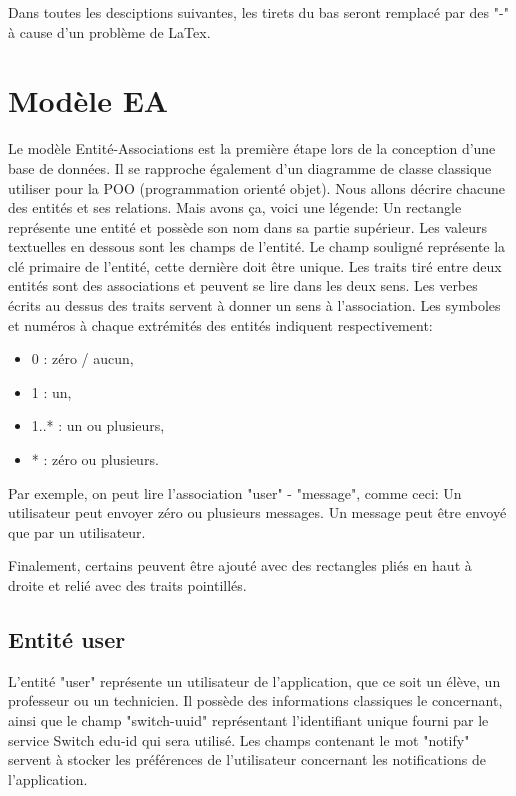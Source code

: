 \documentclass[
    iai, %
    il, %
]{heig-tb}
\begin{document}

Dans toutes les desciptions suivantes, les tirets du bas seront remplacé par des "-" à cause d'un problème de LaTex.

\section{Modèle EA}
Le modèle Entité-Associations est la première étape lors de la conception d'une base de données. Il se rapproche également d'un diagramme de classe classique utiliser pour la POO (programmation orienté objet).\newline
Nous allons décrire chacune des entités et ses relations.\newline
Mais avons ça, voici une légende:\newline
Un rectangle représente une entité et possède son nom dans sa partie supérieur.\newline
Les valeurs textuelles en dessous sont les champs de l'entité. Le champ souligné représente la clé primaire de l'entité, cette dernière doit être unique.\newline
Les traits tiré entre deux entités sont des associations et peuvent se lire dans les deux sens. Les verbes écrits au dessus des traits servent à donner un sens à l'association.\newline
Les symboles et numéros à chaque extrémités des entités indiquent respectivement:
\begin{itemize}
    \item 0 : zéro / aucun,
    \item 1 : un,
    \item 1..* : un ou plusieurs,
    \item * : zéro ou plusieurs.
\end{itemize}

Par exemple, on peut lire l'association "user" - "message", comme ceci:\newline
Un utilisateur peut envoyer zéro ou plusieurs messages.\newline
Un message peut être envoyé que par un utilisateur.

Finalement, certains peuvent être ajouté avec des rectangles pliés en haut à droite et relié avec des traits pointillés.


\subsection{Entité user}
L'entité "user" représente un utilisateur de l'application, que ce soit un élève, un professeur ou un technicien.\newline
Il possède des informations classiques le concernant, ainsi que le champ "switch-uuid" représentant l'identifiant unique fourni par le service Switch edu-id qui sera utilisé.\newline
Les champs contenant le mot "notify" servent à stocker les préférences de l'utilisateur concernant les notifications de l'application.
\end{document}
